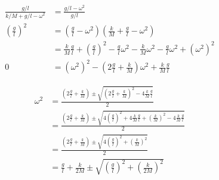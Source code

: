 \documentclass{article}
\begin{document}
\begin{enumerate}
        \begin{align*}
          \frac{g / l}{k / M + g / l - \omega^2} & = \frac{g / l - \omega^2}{g / l}                                                                                                             \\
          \left( \frac{g}{l} \right)^2           & = \left( \frac{g}{l} - \omega^2 \right) \left( \frac{k}{M} + \frac{g}{l} - \omega^2 \right)                                                  \\
                                                 & = \frac{k}{M} \frac{g}{l} + \left( \frac{g}{l} \right)^2 - \frac{g}{l} \omega^2 - \frac{k}{M} \omega^2 - \frac{g}{l} \omega^2 + (\omega^2)^2 \\
          0                                      & = (\omega^2)^2 - \left( 2 \frac{g}{l} + \frac{k}{M} \right) \omega^2 + \frac{k}{M} \frac{g}{l}
        \end{align*}

        \begin{align*}
          \omega^2 & = \frac{\left( 2 \frac{g}{l} + \frac{k}{M} \right) \pm \sqrt{\left( 2 \frac{g}{l} + \frac{k}{M} \right)^2 - 4 \frac{k}{M} \frac{g}{l}}}{2}                                              \\
                   & = \frac{\left( 2 \frac{g}{l} + \frac{k}{M} \right) \pm \sqrt{4 \left( \frac{g}{l} \right)^2 + 4 \frac{k}{M} \frac{g}{l} + \left( \frac{k}{M} \right)^2 - 4 \frac{k}{M} \frac{g}{l}}}{2} \\
                   & = \frac{\left( 2 \frac{g}{l} + \frac{k}{M} \right) \pm \sqrt{4 \left( \frac{g}{l} \right)^2 + \left( \frac{k}{M} \right)^2}}{2}                                                         \\
                   & = \frac{g}{l} + \frac{k}{2 M} \pm \sqrt{\left( \frac{g}{l} \right)^2 + \left( \frac{k}{2 M} \right)^2}
        \end{align*}
\end{enumerate}

\setcounter{subsection}{12}
\subsection{}
\end{document}

